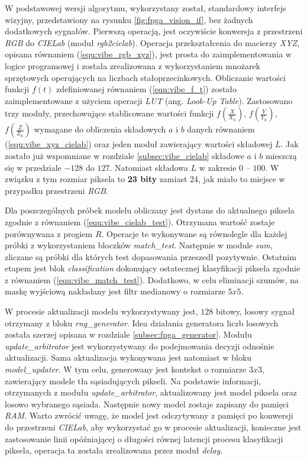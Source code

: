 W podstawowej wersji algorytmu, wykorzystany został, standardowy interfejs wizyjny, przedstawiony na rysunku \ref{fig:fpga_vision_if}, bez żadnych dodatkowych sygnałów. Pierwszą operacją, jest oczywiście konwersja z przestrzeni \textit{RGB} do \textit{CIELab} (moduł \textit{rgb2cielab}). Operacja przekształcenia do macierzy \textit{XYZ}, opisana równaniem (\ref{equ:vibe_rgb_xyz}), jest prosta do zaimplementowania w logice programowej i została zrealizowana z wykorzystaniem mnożarek sprzętowych operujących na liczbach stałoprzecinkowych. Obliczanie wartości funkcji $f(t)$ zdefiniowanej równaniem (\ref{equ:vibe_f_t}) zostało zaimplementowane z użyciem operacji \textit{LUT} (ang. \textit{Look-Up Table}). Zastosowano trzy moduły, przechowujące stablicowane wartości funkcji $f(\frac{X}{X_n})$, $f(\frac{Y}{Y_n})$, $f(\frac{Z}{Z_n})$ wymagane do obliczenia składowych $a$ i $b$ danych równaniem (\ref{equ:vibe_xyz_cielab}) oraz jeden moduł zawierający wartości składowej $L$. Jak zostało już wspomniane w rozdziale \ref{subsec:vibe_cielab} składowe $a$ i $b$ mieszczą się w przedziale $-128$ do $127$. Natomiast składowa $L$ w zakresie $0$ -- $100$. W związku z tym rozmiar piksela to \textbf{23 bity} zamiast 24, jak miało to miejsce w przypadku przestrzeni \textit{RGB}.

Dla poszczególnych próbek modelu obliczany jest dystans do aktualnego piksela zgodnie z równaniem (\ref{equ:vibe_cielab_test}). Otrzymana wartość zostaje porównywana z progiem $R$. Operacje te wykonywane są równolegle dla każdej próbki z wykorzystaniem bloczków \textit{match\_test}. Następnie w module \textit{sum}, zliczane są próbki dla których test dopasowania przeszedł pozytywnie. Ostatnim etapem jest blok \textit{classification} dokonujący ostatecznej klasyfikacji piksela zgodnie z równaniem (\ref{equ:vibe_match_test}). Dodatkowo, w celu eliminacji szumów, na maskę wyjściową nakładany jest filtr medianowy o rozmiarze $5x5$.

W procesie aktualizacji modelu wykorzystywany jest, $128$ bitowy, losowy sygnał otrzymany z bloku \textit{rng\_generator}. Idea działania generatora liczb losowych została szerzej opisana w rozdziale \ref{subsec:fpga_generator}. Modułu \textit{update\_arbitrator} jest wykorzystywany do podejmowania decyzji odnośnie aktualizacji. Sama aktualizacja wykonywana jest natomiast w bloku \textit{model\_updater}. W tym celu, generowany jest kontekst o rozmiarze $3x3$, zawierający modele tła sąsiadujących pikseli. Na podstawie informacji, otrzymanych z modułu \textit{update\_arbitrator}, aktualizowany jest model piksela oraz losowo wybranego sąsiada. Następnie nowy model zostaje zapisany do pamięci \textit{RAM}. Warto zwrócić uwagę, że model jest odczytywany z pamięci po konwersji do przestrzeni \textit{CIELab}, aby wykorzystać go w procesie aktualizacji, konieczne jest zastosowanie linii opóźniającej o długości równej latencji procesu klasyfikacji piksela, operacja ta została zrealizowana przez moduł \textit{delay}.

